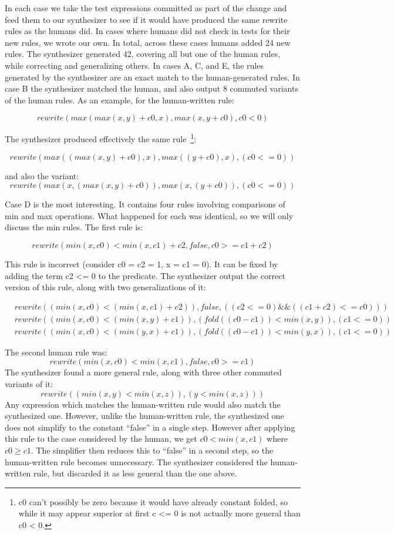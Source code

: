 \documentclass[acmsmall,review,anonymous]{acmart}\settopmatter{printfolios=true,printccs=false,printacmref=false}
\begin{document}
In each case we take the test expressions committed as part of the change and feed them to our synthesizer to see if it would have produced the same rewrite rules as the humans did. In cases where humans did not check in tests for their new rules, we wrote our own. In total, across these cases humans added 24 new rules. The synthesizer generated 42, covering all but one of the human rules, while correcting and generalizing others. In cases A, C, and E, the rules generated by the synthesizer are an exact match to the human-generated rules. In case B the synthesizer matched the human, and also output 8 commuted variants of the human rules. As an example, for the human-written rule:

\[
rewrite(max(max(x, y) + c0, x), max(x, y + c0), c0 < 0)
\]

The synthesizer produced effectively the same rule~\footnote{c0 can’t possibly be zero because it would have already constant folded, so while it may appear superior at first c <= 0 is not actually more general than c0 < 0.}:

\[
rewrite(max((max(x, y) + c0), x), max((y + c0), x), (c0 <= 0))
\]

and also the variant:
\[
rewrite(max(x, (max(x, y) + c0)), max(x, (y + c0)), (c0 <= 0))
\]

Case D is the most interesting. It contains four rules involving comparisons of min and max operations. What happened for each was identical, so we will only discuss the min rules. The first rule is:

\[
rewrite(min(x, c0) < min(x, c1) + c2, false, c0 >= c1 + c2)
\]

This rule is incorrect (consider c0 = c2 = 1, x = c1 = 0). It can be fixed by adding the term c2 <= 0 to the predicate. The synthesizer output the correct version of this rule, along with two generalizations of it:

\begin{align*}
&rewrite((min(x, c0) < (min(x, c1) + c2)), false, ((c2 <= 0) \&\& ((c1 + c2) <= c0))) \\
&rewrite((min(x, c0) < (min(x, y) + c1)), (fold((c0 - c1)) < min(x, y)), (c1 <= 0)) \\
&rewrite((min(x, c0) < (min(y, x) + c1)), (fold((c0 - c1)) < min(y, x)), (c1 <= 0))
\end{align*}

The second human rule was:
\[
rewrite(min(x, c0) < min(x, c1), false, c0 >= c1) 
\]
The synthesizer found a more general rule, along with three other commuted variants of it:
\[
rewrite((min(x, y) < min(x, z)), (y < min(x, z)))
\]
Any expression which matches the human-written rule would also match the synthesized one. However, unlike the human-written rule, the synthesized one does not simplify to the constant “false” in a single step. However after applying this rule to the case considered by the human, we get $c0 < min(x, c1)$ where $c0 \geq c1$. The simplifier then reduces this to “false” in a second step, so the human-written rule becomes unnecessary. The synthesizer considered the human-written rule, but discarded it as less general than the one above.
\end{document}

